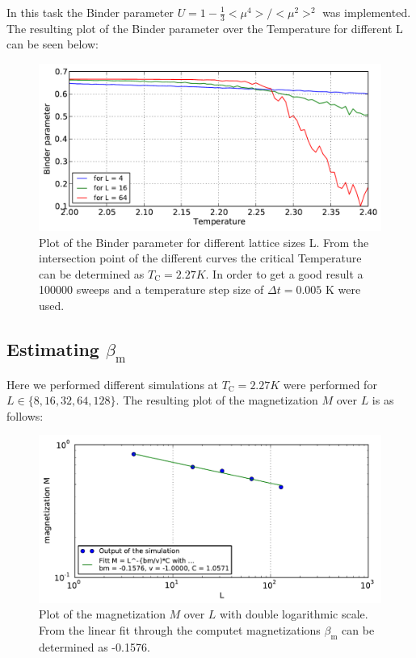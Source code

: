 \documentclass[12pt,a4paper]{scrartcl}
\begin{document}
In this task the Binder parameter $ U = 1 - \frac{1}{3} <\mu^4>/<\mu^2>^2$ was implemented. The resulting plot of the Binder parameter over the Temperature for different L can be seen below:

\begin{figure}[H]
\includegraphics[width=13.0cm]{../plots/2binder_01.pdf}
\caption{Plot of the Binder parameter for different lattice sizes L. From the intersection point of the different curves the critical Temperature can be determined as $T_\text{C} = 2.27 K$. In order to get a good result a 100000 sweeps and a temperature step size of $\Delta t = 0.005$ K were used.}
\end{figure}

\subsection{Estimating $\beta_\text{m}$}

Here we performed different simulations at $T_\text{C} = 2.27 K$ were performed for $L \in \lbrace 8, 16, 32, 64, 128 \rbrace$. The resulting plot of the magnetization $M$ over $L$ is as follows:

\begin{figure}[H]
\includegraphics[width=13.0cm]{../plots/3beta_01.pdf}
\caption{Plot of the magnetization $M$ over $L$ with double logarithmic scale. From the linear fit through the computet magnetizations $\beta_\text{m}$ can be determined as -0.1576.}
\end{figure}
\end{document}
